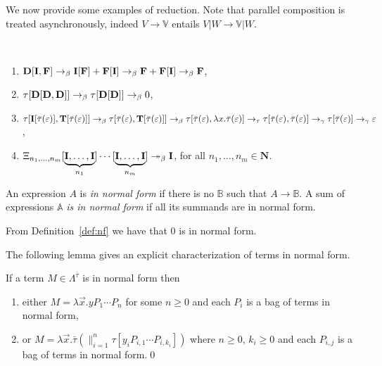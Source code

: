 \documentclass{LMCS}
\newcommand{\nat}{\mathbf{N}}
\newcommand{\lam}{\ensuremath{\lambda}}
\newcommand{\paral}{\vert}
\newcommand{\Set}[1]{\Lambda^{#1}}
\newcommand{\msto}{\twoheadrightarrow}
\newcommand{\seq}[1]{\vec{#1}}
\newcommand{\sA}{\mathbb{A}}
\newcommand{\sB}{\mathbb{B}}
\newcommand{\sV}{\mathbb{V}}
\newcommand{\gt}{\ensuremath{\tau}}
\newcommand{\gto}{\ensuremath{\bar\tau}}
\begin{document}
We now provide some examples of reduction.
Note that parallel composition is treated asynchronously, indeed $V\to \sV$ entails $V\paral W\to \sV\paral W$. 

\begin{exa}\label{ex:beta-reduction}\
\begin{enumerate}[1.] 
\item $\bold{D}[\bold{I},\bold{F}]\to_\beta \bold{I}[\bold{F}] + \bold{F}[\bold{I}]\to_\beta \bold{F} + \bold{F}[\bold{I}]\to_\beta \bold{F}$,
\item $\gt[\bold{D}[\bold{D},\bold{D}]]\to_\beta \gt[\bold{D}[\bold{D}]] \to_\beta 0$,
\item $\gt[\bold{I}[\gto(\varepsilon)],\bold{T}[\gto(\varepsilon)]]\to_\beta 
	  \gt[\gto(\varepsilon),\bold{T}[\gto(\varepsilon)]]\to_\beta
	  \gt[\gto(\varepsilon),\lam x.\gto(\varepsilon)]\to_\tau
	  \gt[\gto(\varepsilon),\gto(\varepsilon)]\to_\gamma
	  \gt[\gto(\varepsilon)]\to_\gamma
	  \varepsilon$,  
\item\label{ex:beta-reduction4} $\Xi_{n_1,\ldots,n_m}[\underbrace{\bold{I},\dots,\bold{I}}_{n_1}]\cdots[\underbrace{\bold{I},\dots,\bold{I}}_{n_m}]\msto_\beta \bold{I}$, for all $n_1,\dots,n_m\in\nat$.
\end{enumerate}
\end{exa}

\begin{defi}\label{def:nf}
An expression $A$ is \emph{in normal form} if there is no $\sB$ such that $A\to \sB$.
A sum of expressions $\sA$ \emph{is in normal form} if all its summands are in normal form.
\end{defi}

From Definition~\ref{def:nf} we have that $0$ is in normal form.

The following lemma gives an explicit characterization of terms in normal form.

\begin{lem} If a term $M\in\Set{\gto}$ is in normal form then
\begin{enumerate}[1.] 
\item either $M = \lam \seq x.yP_1\cdots P_n$ for some $n\ge 0$ and each $P_i$ is a bag of terms in normal form, 
\item or $M = \lam \seq x.\gto(\parallel_{i=1}^n\gt[y_i P_{i,1}\cdots P_{i,k_i}])$
where $n\ge 0$, $k_i\ge 0$ and each $P_{i,j}$ is a bag of terms in normal form.\qed
\end{enumerate}
\end{lem}
\end{document}
